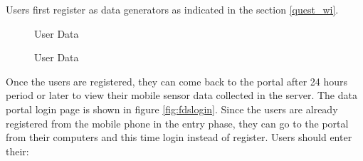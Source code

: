 Users first register as data generators as indicated in the section \ref{quest_wi}.
\begin{figure}[htp]
  \hspace{1em}\hspace{1em}
  \caption{User Data}
  \label{fig:fds2}
\end{figure}

\begin{figure}[htp]
  \hspace{1em}\hspace{1em}
  \caption{User Data}
  \label{fig:fds3}
\end{figure}

Once the users are registered, they can come back to the portal after 24 hours period or later to view their mobile sensor data collected in the server. The data portal login page is shown in figure \ref{fig:fdslogin}. Since the users are already registered from the mobile phone in the entry phase, they can go to the portal from their computers and this time login instead of register. Users should enter their: 

